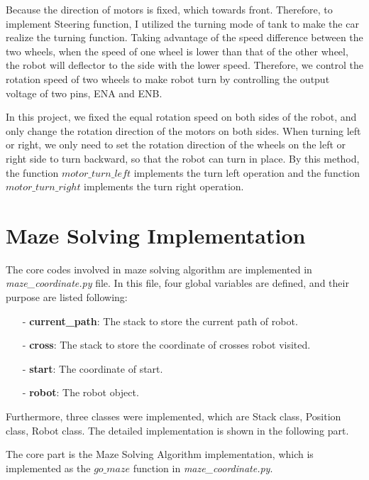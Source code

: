 \documentclass[11pt,times,oneside,openright,hardcopy]{eeereport}
\begin{document}
Because the direction of motors is fixed, which towards front. Therefore, to implement Steering function, I utilized the turning mode of tank to make the car realize the turning function.
Taking advantage of the speed difference between the two wheels, when the speed of one wheel is lower than that of the other wheel, the robot will deflector to the side with the lower speed. 
Therefore, we control the rotation speed of two wheels to make robot turn by controlling the output voltage of two pins, ENA and ENB.

In this project, we fixed the equal rotation speed on both sides of the robot, and only change the rotation direction of the motors on both sides. 
When turning left or right, we only need to set the rotation direction of the wheels on the left or right side to turn backward, so that the robot can turn in place.
By this method, the function $motor\_turn\_left$ implements the turn left operation and the function $motor\_turn\_right$ implements the turn right operation.

\section{Maze Solving Implementation}
The core codes involved in maze solving algorithm are implemented in \textit{maze\_coordinate.py} file. 
In this file, four global variables are defined, and their purpose are listed following:
\begin{itemize}
    \item[-] \textbf{current\_path}: The stack to store the current path of robot.
    \item[-] \textbf{cross}: The stack to store the coordinate of crosses robot visited.
    \item[-] \textbf{start}: The coordinate of start.
    \item[-] \textbf{robot}: The robot object.
\end{itemize}

Furthermore, three classes were implemented, which are Stack class, 
Position class, Robot class. The detailed implementation is shown in the following part. 

The core part is the Maze Solving Algorithm implementation, which is implemented as the $go\_maze$ function in \textit{maze\_coordinate.py}.
\end{document}
